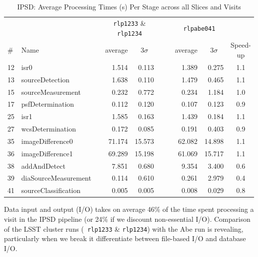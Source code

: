 \begin{table}[htbp]
\begin{center}
\caption{IPSD: Average Processing Times (s) Per Stage across all
  Slices and Visits
\label{tbl:allscislices}}
\vspace{\baselineskip}
\begin{tabular}{llcrrc|crr|c}
\hline\hline
   &      && \multicolumn{2}{c}{{\tt rlp1233} \& {\tt rlp1234}} 
         &&& \multicolumn{2}{c|}{{\tt rlpabe041}} & \\
\# & Name && \multicolumn{1}{c}{average}&\multicolumn{1}{c}{$3\sigma$} 
         &&& \multicolumn{1}{c}{average}&\multicolumn{1}{c|}{$3\sigma$} 
   & Speed-up \\ 
\hline
12 &                 isr0 &&  1.514 &  0.113 &&&  1.389 &  0.275 & 1.1 \\  %
13 &      sourceDetection &&  1.638 &  0.110 &&&  1.479 &  0.465 & 1.1 \\  %
15 &    sourceMeasurement &&  0.232 &  0.772 &&&  0.234 &  1.184 & 1.0 \\  %
17 &     psfDetermination &&  0.112 &  0.120 &&&  0.107 &  0.123 & 0.9 \\  %
25 &                 isr1 &&  1.585 &  0.163 &&&  1.439 &  0.184 & 1.1 \\  %
27 &     wcsDetermination &&  0.172 &  0.085 &&&  0.191 &  0.403 & 0.9 \\  %
35 &     imageDifference0 && 71.174 & 15.573 &&& 62.082 & 14.898 & 1.1 \\  %
36 &     imageDifference1 && 69.289 & 15.198 &&& 61.069 & 15.717 & 1.1 \\  %
38 &         addAndDetect &&  7.851 &  0.680 &&&  9.354 &  3.400 & 0.6 \\  %
39 & diaSourceMeasurement &&  0.114 &  0.610 &&&  0.261 &  2.979 & 0.4 \\  %
41 & sourceClassification &&  0.005 &  0.005 &&&  0.008 &  0.029 & 0.8 \\  %
\hline
\end{tabular}
\end{center}
\end{table}

Data input and output (I/O) takes on average 46\% of the time spent
processing a visit in the IPSD pipeline (or 24\% if we discount
non-essential I/O).  Comparison of the LSST cluster runs ({\tt
rlp1233} \& {\tt rlp1234}) with the Abe run is revealing, particularly
when we break it differentiate between file-based I/O and database
I/O.  





